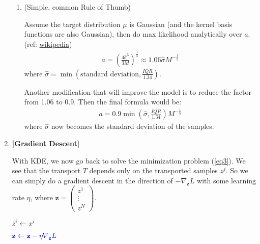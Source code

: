 \documentclass[11pt]{article}
\begin{document}
\begin{enumerate}
\begin{enumerate}
        \item (Simple, common Rule of Thumb)
        
        Assume the target distribution $\mu$ is Gaussian (and the kernel basis functions are also Gaussian), then do max likelihood analytically over $a$. (ref: \href{https://en.wikipedia.org/wiki/Kernel_density_estimation}{wikipedia})
        \begin{align*}
            a = (\frac{4\hat{\sigma}^5}{3M})^{\frac{1}{5}} \approx
            1.06 \hat{\sigma} M^{-\frac{1}{5}}
        \end{align*}
        where $\hat{\sigma} = \min (\text{standard deviation}, \frac{IQR}{1.34})$.
        
        Another modification that will improve the model is to reduce the factor from 1.06 to 0.9. Then the final formula would be:
        \begin{align*}
            a = 0.9 \min (\hat{\sigma}, \frac{IQR}{1.34}) M^{-\frac{1}{5}}
        \end{align*}
        where $\hat{\sigma}$ now becomes the standard deviation of the samples.
    \end{enumerate}
    
    \item {\bf [Gradient Descent]}
    
    With KDE, we now go back to solve the minimization problem (\ref{eq3}).
    We see that the transport $T$ depends only on the transported samples $z^j$. So we can simply do a gradient descent in the direction of $-\nabla_{\mathbf{z}} L$ with some learning rate $\eta$, where $\mathbf{z} = \begin{pmatrix}
    z^1 \\ \vdots \\ z^N
    \end{pmatrix}$.
    
        \begin{algorithm}[h]
        \caption{Gradient Descent w.r.t $\mathbf{z}$}
        \begin{algorithmic}
        \label{algo1}
        \State $z^i \gets x^i$
        \EndFor
            
        \textcolor{blue}{\State $\mathbf{z} \gets \mathbf{z} - \eta \nabla_{\mathbf{z}} L$} 
        \EndWhile
            
        \end{algorithmic}
        \end{algorithm}
    

\end{enumerate}
\end{document}
